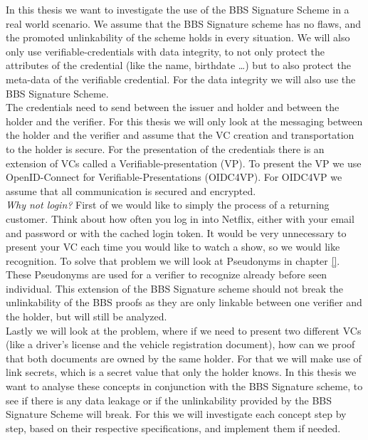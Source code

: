 \documentclass[
	a4paper               %
	,BCOR=0mm            %
	,bibliography=totoc   %
	,listof=totoc         %
	,monolingual
	,twoside=false
]{bfhthesis}              %
\begin{document}
In this thesis we want to investigate the use of the BBS Signature Scheme in a real world scenario.
We assume that the BBS Signature scheme has no flaws, and the promoted unlinkability of the scheme holds in every situation.
We will also only use verifiable-credentials with data integrity, to not only protect the attributes of the credential (like the name, birthdate \dots) but to also protect the meta-data of the verifiable credential.
For the data integrity we will also use the BBS Signature Scheme.\\

The credentials need to send between the issuer and holder and between the holder and the verifier.
For this thesis we will only look at the messaging between the holder and the verifier and assume that the VC creation and transportation to the holder is secure.
For the presentation of the credentials there is an extension of VCs called a Verifiable-presentation (VP)\cite{verifiable-credentials}.
To present the VP we use OpenID-Connect for Verifiable-Presentations (OIDC4VP)\cite{oidc4vp}.
For OIDC4VP we assume that all communication is secured and encrypted.\\

\textit{Why not login?}
First of we would like to simply the process of a returning customer.
Think about how often you log in into Netflix, either with your email and password or with the cached login token.
It would be very unnecessary to present your VC each time you would like to watch a show, so we would like recognition.
To solve that problem we will look at Pseudonyms\cite{pseudonyms} in chapter \ref{}.\\

These Pseudonyms are used for a verifier to recognize already before seen individual.
This extension of the BBS Signature scheme should not break the unlinkability of the BBS proofs as they are only linkable between one verifier and the holder, but will still be analyzed.\\

Lastly we will look at the problem, where if we need to present two different VCs (like a driver's license and the vehicle registration document), how can we proof that both documents are owned by the same holder.
For that we will make use of link secrets\cite{linksecrets}, which is a secret value that only the holder knows.
In this thesis we want to analyse these concepts in conjunction with the BBS Signature scheme, to see if there is any data leakage or if the unlinkability provided by the BBS Signature Scheme will break.
For this we will investigate each concept step by step, based on their respective specifications, and implement them if needed.
\end{document}
